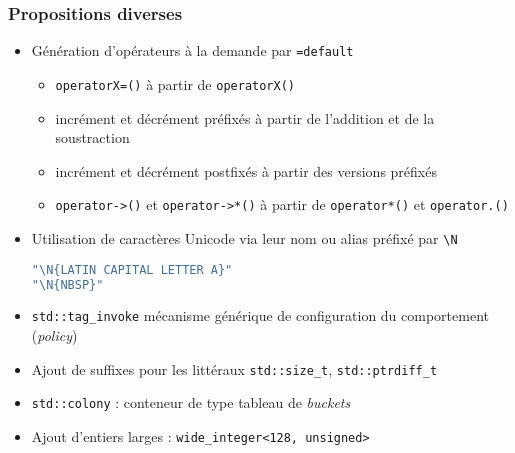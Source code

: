 \documentclass[C++.tex]{subfiles}
\begin{document}
\begin{frame}[fragile]
	\frametitle{Propositions diverses}
	\begin{itemize}
		\item Génération d'opérateurs à la demande par \lstinline|=default|
		\begin{itemize}
			\item \lstinline|operatorX=()| à partir de \lstinline|operatorX()|
			\item incrément et décrément préfixés à partir de l'addition et de la soustraction
			\item incrément et décrément postfixés à partir des versions préfixés
			\item \lstinline|operator->()| et \lstinline|operator->*()| à partir de \lstinline|operator*()| et \lstinline|operator.()|


		\end{itemize}
	
		\item Utilisation de caractères Unicode via leur nom ou alias préfixé par \lstinline|\N|

		\begin{lstlisting}[language=C++]
"\N{LATIN CAPITAL LETTER A}"
"\N{NBSP}"\end{lstlisting}

		\item \lstinline|std::tag_invoke| mécanisme générique de configuration du comportement (\textit{policy})


		\item Ajout de suffixes pour les littéraux \lstinline|std::size_t|, \lstinline|std::ptrdiff_t|
		\item \lstinline|std::colony| : conteneur de type \og tableau de \textit{buckets}\fg{}
		\item Ajout d'entiers larges : \lstinline|wide_integer<128, unsigned>|
	\end{itemize}
\end{frame}
\end{document}
